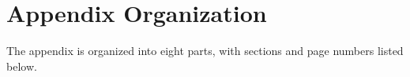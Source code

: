 \section*{Appendix Organization}
\label{app:organization}
The appendix is organized into eight parts, with sections and page numbers listed below.

\vspace{0.6em}

